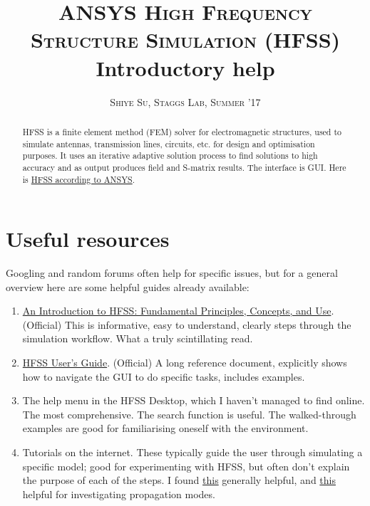 \documentclass[11pt]{article}
\title{\textsc{{ANSYS High Frequency Structure Simulation (HFSS)}} \\ Introductory help \vspace{-0.5cm}}
\author{\textsc{Shiye Su, Staggs Lab, Summer '17} \vspace{0cm}}
\date{\vspace{-1cm}}
\begin{document}
\maketitle

\begin{abstract}

HFSS is a finite element method (FEM) solver for electromagnetic structures, used to simulate antennas, transmission lines, circuits, etc. for design and optimisation purposes. It uses an iterative adaptive solution process to find solutions to high accuracy and as output produces field and S-matrix results. The interface is GUI. Here is \href{http://www.ansys.com/products/electronics/ansys-hfss}{HFSS according to ANSYS}. 

\end{abstract}

\vspace{2cm}

\tableofcontents

\newpage


\section{Useful resources}
\label{sec:resources}

Googling and random forums often help for specific issues, but for a general overview here are some helpful guides already available:

\begin{enumerate}

	\item \href{http://e-science.ru/sites/default/files/upload_forums_files/8u/HFSSintro.pdf}{An Introduction to HFSS: Fundamental Principles, Concepts, and Use}. (Official) This is informative, easy to understand, clearly steps through the simulation workflow. What a truly scintillating read. 

	\item \href{http://anlage.umd.edu/HFSSv10UserGuide.pdf}{HFSS User's Guide}. (Official) A long reference document, explicitly shows how to navigate the GUI to do specific tasks, includes examples. 

	\item The help menu in the HFSS Desktop, which I haven't managed to find online. The most comprehensive. The search function is useful. The walked-through examples are good for familiarising oneself with the environment.

	\item Tutorials on the internet. These typically guide the user through simulating a specific model; good for experimenting with HFSS, but often don't explain the purpose of each of the steps. I found \href{https://indico.fnal.gov/getFile.py/access?contribId=10&resId=1&materialId=slides&confId=13068}{this} generally helpful, and \href{http://www.rit.edu/~w-eta/docs/Project-1-HFSS-tutorial-Rectangular%20WG.pdf}{this} helpful for investigating propagation modes.

\end{enumerate}
\end{document}
